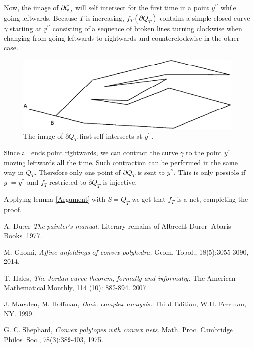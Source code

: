 \documentclass[openright, 12pt]{article}
\begin{document}
Now, the image of $\partial  Q_T$ will self intersect for the first time in a point $y^{\prime\prime}$ while going leftwards. Because $T$ is increasing, $f_T(\partial Q_T)$ contains a simple closed curve $\gamma$ starting at $y^{\prime \prime}$ consisting of a sequence of broken lines turning clockwise when changing from going leftwards to rightwards and counterclockwise in the other case.




\begin{figure}[h]
\centering
{}
\includegraphics[scale=0.7]{Prime.eps}
\caption{The image of $\partial Q_T$ first self intersects at $y^{\prime \prime}$.}
\end{figure}


Since all ends point rightwards, we can contract the curve $\gamma$ to the point  $y^{\prime \prime}$ moving leftwards all the time. Such contraction can be performed in the same way in $Q_T$. Therefore only one point of $\partial Q _T$ is sent to $y^{\prime \prime}$. This is only possible if $y^{\prime} = y^{\prime \prime}$ and $f_T$ restricted to $\partial Q_T$ is injective.


Applying lemma \ref{Argument} with $S=Q_T$ we get that $f_T$ is a net, completing the proof.


\begin{thebibliography}{9}

 A. Durer \textit{The painter's manual.} Literary remains of Albrecht Durer. Abaris Books. 1977.

 M. Ghomi, \textit{Affine unfoldings of convex polyhedra.} Geom. Topol., 18(5):3055-3090, 2014. 
  
  
  T. Hales, \textit{The Jordan curve theorem, formally and informally.} The American Mathematical Monthly, 114 (10): 882-894. 2007.

  J. Marsden, M. Hoffman,  \textit{Basic complex analysis.} Third Edition, W.H. Freeman, NY. 1999.  
  

G. C. Shephard, \textit{Convex polytopes with convex nets.} Math. Proc. Cambridge Philos. Soc., 78(3):389-403, 1975. 
  
\end{thebibliography}
\end{document}

